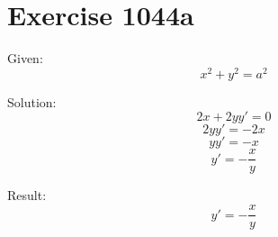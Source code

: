 \documentclass[a4paper, 10pt]{scrartcl}
\begin{document}
\section{Exercise 1044a}

Given:
\[
x^{2} + y^{2} = a^{2}
\]

Solution:
\[
2x + 2yy' = 0
\]
\[
2yy' = -2x
\]
\[
yy' = -x
\]
\[
y' = -\frac{x}{y}
\]

Result:
\[
y' = -\frac{x}{y}
\]
\end{document}
